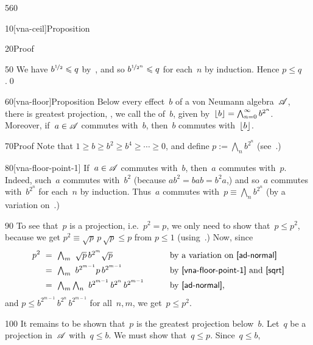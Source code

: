 \begin{parsec}{560}
\begin{point}{10}[vna-ceil]{Proposition}
\begin{point}{20}{Proof}
\begin{point}{50}
We have $b^{\nicefrac{1}{2}}\leq q$
by~,
and so $b^{\nicefrac{1}{2^n}}\leq q$ for each~$n$ by induction.
Hence $p\leq q$.\qed
\end{point}
\end{point}
\end{point}
\begin{point}{60}[vna-floor]{Proposition}%
Below every effect~$b$ of a von Neumann algebra~$\scrA$,
there is greatest projection, ,%
	we call the %
of~$b$,
given by~$\floor{b} = \bigwedge_{n=0}^\infty b^{2^{n}}$.\\
Moreover, if~$a\in \scrA$ commutes with~$b$,
then~$b$ commutes with~$\floor{b}$.
\begin{point}{70}{Proof}%
Note that $1\geq b\geq b^2 \geq b^4 \geq  \dotsb \geq 0$,
    and define $p:=\bigwedge_n b^{2^n}$
    (see~.)
\begin{point}{80}[vna-floor-point-1]%
If~$a\in \scrA$ commutes with~$b$,
then~$a$ commutes with~$p$.
Indeed, such~$a$ commutes with~$b^2$ (because
$ab^2 = bab = b^2a$,)
and so~$a$ commutes with~$b^{2^n}$ for each~$n$ by induction.
Thus~$a$ commutes with~$p\equiv\bigwedge_n b^{2^n}$ 
(by a variation on~.)
\end{point}
\begin{point}{90}%
To see that~$p$ is a projection, i.e.~$p^2=p$,
we only need to show that~$p\leq p^2$,
because we get $p^2\equiv \sqrt{p}\,p\,\sqrt{p}\leq p$
from $p\leq 1$ (using~.)
Now, since
\begin{alignat*}{3}
p^2 \ &=\ \textstyle \bigwedge_m\  \sqrt{p}\, b^{2^m} \sqrt{p}\qquad
&&\text{by a variation on~\sref{ad-normal}}\\
&=\ \textstyle \bigwedge_m \ b^{2^{m-1}} p\, b^{2^{m-1}}\qquad
&&\text{by~\sref{vna-floor-point-1} and~\sref{sqrt}}\\
&=\ \textstyle \bigwedge_m \bigwedge_n \ 
b^{2^{m-1}}\, b^{2^n}\, b^{2^{m-1}}\qquad
&&\text{by~\sref{ad-normal},}
\end{alignat*}
and $p\leq b^{2^{m-1}}\, b^{2^n}\,b^{2^{m-1}}$
for all~$n,m$, we get~$p\leq p^2$.
\end{point}
\begin{point}{100}%
It remains to be shown that~$p$ is the greatest projection below~$b$.
Let~$q$ be a projection in~$\scrA$ with~$q\leq b$.
We must show that~$q\leq p$.
Since~$q\leq b$,

\end{point}
\end{point}
\end{point}
\end{parsec}
